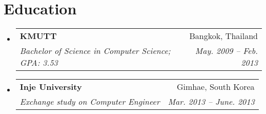 \documentclass[letterpaper,12pt]{article}
\makeatletter
\newcommand{\resumeSubheading}[4]{
  \vspace{-1pt}\item
    \begin{tabular*}{0.97\textwidth}[t]{l@{\extracolsep{\fill}}r}
      \textbf{#1} & #2 \\
      \textit{\small#3} & \textit{\small #4} \\
    \end{tabular*}\vspace{-5pt}
}
\newcommand{\resumeSubHeadingListStart}{\begin{itemize}[leftmargin=*]}
\newcommand{\resumeSubHeadingListEnd}{\end{itemize}}
\makeatother
\begin{document}
\section{Education}
  \resumeSubHeadingListStart
    \resumeSubheading
      {KMUTT}{Bangkok, Thailand}
      {Bachelor of Science in Computer Science;  GPA: 3.53}{May. 2009 -- Feb. 2013}
    \resumeSubheading
      {Inje University}{Gimhae, South Korea}
      {Exchange study on Computer Engineer}{Mar. 2013 -- June. 2013}
  \resumeSubHeadingListEnd

\end{document}
